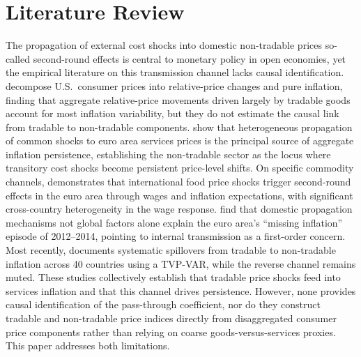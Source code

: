 \documentclass[a4paper,12pt]{article}
\begin{document}
\section{Literature Review}
The propagation of external cost shocks into domestic non-tradable prices so-called second-round effects is central to monetary policy in open economies, yet the empirical literature on this transmission channel lacks causal identification.  decompose U.S.\ consumer prices into relative-price changes and pure inflation, finding that aggregate relative-price movements driven largely by tradable goods account for most inflation variability, but they do not estimate the causal link from tradable to non-tradable components.  show that heterogeneous propagation of common shocks to euro area services prices is the principal source of aggregate inflation persistence, establishing the non-tradable sector as the locus where transitory cost shocks become persistent price-level shifts. On specific commodity channels,  demonstrates that international food price shocks trigger second-round effects in the euro area through wages and inflation expectations, with significant cross-country heterogeneity in the wage response.  find that domestic propagation mechanisms not global factors alone explain the euro area's ``missing inflation'' episode of 2012--2014, pointing to internal transmission as a first-order concern. Most recently,  documents systematic spillovers from tradable to non-tradable inflation across 40 countries using a TVP-VAR, while the reverse channel remains muted. These studies collectively establish that tradable price shocks feed into services inflation and that this channel drives persistence. However, none provides causal identification of the pass-through coefficient, nor do they construct tradable and non-tradable price indices directly from disaggregated consumer price components rather than relying on coarse goods-versus-services proxies. This paper addresses both limitations.
\end{document}
